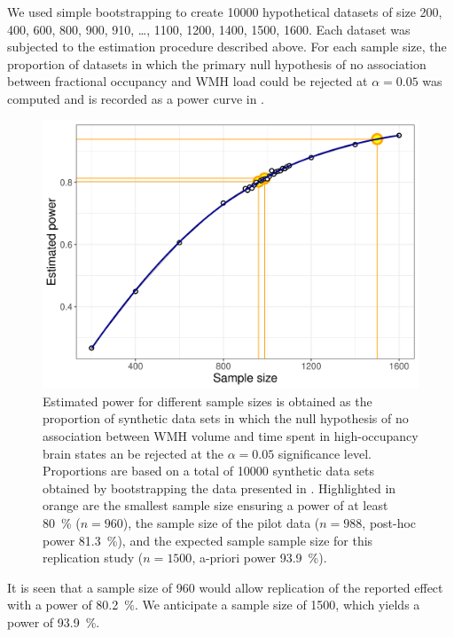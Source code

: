 We used simple bootstrapping to create \num{10000} hypothetical datasets of size \num{200}, \num{400}, \num{600}, \num{800}, \num{900}, \num{910}, \ldots, \num{1100}, \num{1200}, \num{1400}, \num{1500}, \num{1600}.
Each dataset was subjected to the estimation procedure described above.
For each sample size, the proportion of datasets in which the primary null hypothesis of no association between fractional occupancy and WMH load could be rejected at $\alpha=0.05$ was computed and is recorded as a power curve in .

\begin{figure}
    \includegraphics[width=.5\linewidth]{./../analysis/code/R/pipeline_files/figure-html/power-1.png}
    \caption{Estimated power for different sample sizes is obtained as the proportion of synthetic data sets in which the null hypothesis of no association between WMH volume and time spent in high-occupancy brain states an be rejected at the $\alpha=0.05$ significance level. Proportions are based on a total of \num{10000} synthetic data sets obtained by bootstrapping the data presented in \citep{Schlemm2022-he}. Highlighted in orange are the smallest sample size ensuring a power of at least \qty{80}{\percent} ($n=960$), the sample size of the pilot data ($n=988$, post-hoc power \qty{81.3}{\percent}), and the expected sample sample size for this replication study ($n=1500$, a-priori power \qty{93.9}{\percent}).}
    \label{fig:power}
\end{figure}

It is seen that a sample size of \num{960} would allow replication of the reported effect with a power of \qty{80.2}{\percent}.
We anticipate a sample size of \num{1500}, which yields a power of \qty{93.9}{\percent}.


